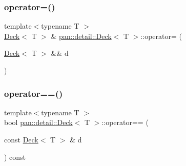 \mbox{\label{classpan_1_1detail_1_1_deck_a1c8b3bed015f5dce938b22b6cc7c53d9}} 
\subsubsection{\texorpdfstring{operator=()}{operator=()}\hspace{0.1cm}{\footnotesize\ttfamily [2/2]}}
{\footnotesize\ttfamily template$<$typename T $>$ \\
\hyperlink{classpan_1_1detail_1_1_deck}{Deck}$<$ T $>$ \& \hyperlink{classpan_1_1detail_1_1_deck}{pan\+::detail\+::\+Deck}$<$ T $>$\+::operator= (\begin{DoxyParamCaption}\item[{\hyperlink{classpan_1_1detail_1_1_deck}{Deck}$<$ T $>$ \&\&}]{d }\end{DoxyParamCaption})}

\mbox{\label{classpan_1_1detail_1_1_deck_a0037b1f2bd8d60577b2943f9fefa5417}} 
\subsubsection{\texorpdfstring{operator==()}{operator==()}}
{\footnotesize\ttfamily template$<$typename T $>$ \\
bool \hyperlink{classpan_1_1detail_1_1_deck}{pan\+::detail\+::\+Deck}$<$ T $>$\+::operator== (\begin{DoxyParamCaption}\item[{const \hyperlink{classpan_1_1detail_1_1_deck}{Deck}$<$ T $>$ \&}]{d }\end{DoxyParamCaption}) const\hspace{0.3cm}{\ttfamily [inline]}}

\mbox{\label{classpan_1_1detail_1_1_deck_a49faca6aade745781eeaa048902c3045}} 
